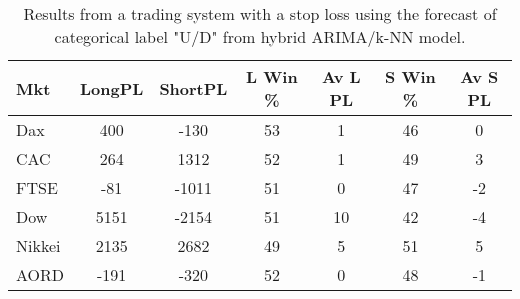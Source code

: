 \begin{table}[ht]
\centering
\caption[Results from a trading system with a stop loss using the forecast of categorical label "U/D" from hybrid ARIMA/k-NN model]{Results from a trading system with a stop loss using the forecast of categorical label "U/D" from hybrid ARIMA/k-NN model.} 
\label{tab:chp_ts:pUD_CAT_arima_knn_sys_SL}
\begin{tabular}{lcccccc}
  \toprule Mkt & LongPL & ShortPL & L Win \% & Av L PL & S Win \% & Av S PL \\ 
  \midrule Dax & 400 & -130 & 53 & 1 & 46 & 0 \\ 
  CAC & 264 & 1312 & 52 & 1 & 49 & 3 \\ 
  FTSE & -81 & -1011 & 51 & 0 & 47 & -2 \\ 
  Dow & 5151 & -2154 & 51 & 10 & 42 & -4 \\ 
  Nikkei & 2135 & 2682 & 49 & 5 & 51 & 5 \\ 
  AORD & -191 & -320 & 52 & 0 & 48 & -1 \\ 
   \bottomrule \end{tabular}
\end{table}

